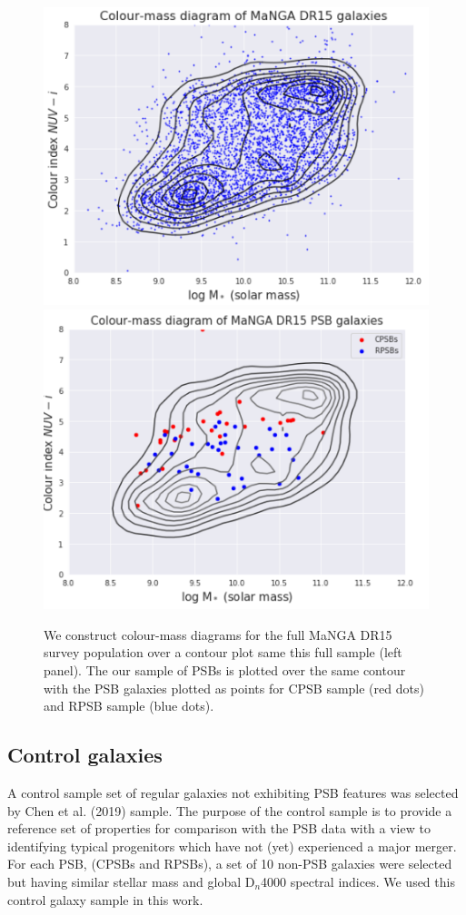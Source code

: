 \begin{figure}
    \centering
    \includegraphics[width=\columnwidth]{images/CMDs/Colour-Mass-DR15-All.png}
    \includegraphics[width=\columnwidth]{images/CMDs/Colour-Mass-DR15-PSBs.png}
    \caption{We construct colour-mass diagrams for the full MaNGA DR15 survey population over a contour plot same this full sample (left panel). The our sample of PSBs is plotted over the same contour with the PSB galaxies plotted as points for CPSB sample (red dots) and RPSB sample (blue dots).}
    \label{fig:Colour-Mass-PSBs}
\end{figure}


\subsection{Control galaxies}
\label{sec:controls}
A control sample set of regular galaxies not exhibiting PSB features was selected by Chen et al. (2019) sample. The purpose of the control sample is to provide a reference set of properties for comparison with the PSB data with a view to identifying typical progenitors which have not (yet) experienced a major merger. For each PSB, (CPSBs and RPSBs), a set of 10 non-PSB galaxies were selected but having similar stellar mass and global D$_n$4000 spectral indices. We used this control galaxy sample in this work.

